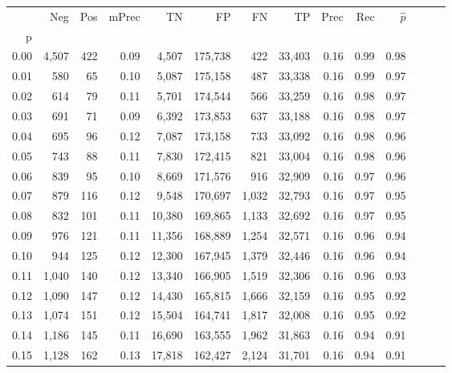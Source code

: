 \begin{tabular}{rrrrrrrrrrrrrr}
\toprule
{} &    Neg &  Pos & mPrec &       TN &       FP &      FN &      TP &  Prec &   Rec & $\hat{p}$ \\
p    &        &      &       &          &          &         &         &       &       &           \\
\midrule
0.00 &  4,507 &  422 &  0.09 &    4,507 &  175,738 &     422 &  33,403 &  0.16 &  0.99 &      0.98 \\
0.01 &    580 &   65 &  0.10 &    5,087 &  175,158 &     487 &  33,338 &  0.16 &  0.99 &      0.97 \\
0.02 &    614 &   79 &  0.11 &    5,701 &  174,544 &     566 &  33,259 &  0.16 &  0.98 &      0.97 \\
0.03 &    691 &   71 &  0.09 &    6,392 &  173,853 &     637 &  33,188 &  0.16 &  0.98 &      0.97 \\
0.04 &    695 &   96 &  0.12 &    7,087 &  173,158 &     733 &  33,092 &  0.16 &  0.98 &      0.96 \\
0.05 &    743 &   88 &  0.11 &    7,830 &  172,415 &     821 &  33,004 &  0.16 &  0.98 &      0.96 \\
0.06 &    839 &   95 &  0.10 &    8,669 &  171,576 &     916 &  32,909 &  0.16 &  0.97 &      0.96 \\
0.07 &    879 &  116 &  0.12 &    9,548 &  170,697 &   1,032 &  32,793 &  0.16 &  0.97 &      0.95 \\
0.08 &    832 &  101 &  0.11 &   10,380 &  169,865 &   1,133 &  32,692 &  0.16 &  0.97 &      0.95 \\
0.09 &    976 &  121 &  0.11 &   11,356 &  168,889 &   1,254 &  32,571 &  0.16 &  0.96 &      0.94 \\
0.10 &    944 &  125 &  0.12 &   12,300 &  167,945 &   1,379 &  32,446 &  0.16 &  0.96 &      0.94 \\
0.11 &  1,040 &  140 &  0.12 &   13,340 &  166,905 &   1,519 &  32,306 &  0.16 &  0.96 &      0.93 \\
0.12 &  1,090 &  147 &  0.12 &   14,430 &  165,815 &   1,666 &  32,159 &  0.16 &  0.95 &      0.92 \\
0.13 &  1,074 &  151 &  0.12 &   15,504 &  164,741 &   1,817 &  32,008 &  0.16 &  0.95 &      0.92 \\
0.14 &  1,186 &  145 &  0.11 &   16,690 &  163,555 &   1,962 &  31,863 &  0.16 &  0.94 &      0.91 \\
0.15 &  1,128 &  162 &  0.13 &   17,818 &  162,427 &   2,124 &  31,701 &  0.16 &  0.94 &      0.91 \\

\end{tabular}
